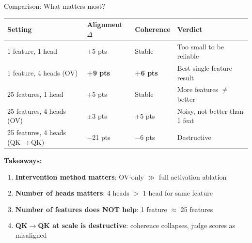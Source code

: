 \documentclass[aspectratio=169]{beamer}
\begin{document}
\begin{frame}{Comparison: What matters most?}
\begin{table}
\small
\centering
\begin{tabular}{p{4cm}p{2.5cm}p{2.5cm}p{4cm}}
\toprule
\textbf{Setting} & \textbf{Alignment $\Delta$} & \textbf{Coherence} & \textbf{Verdict} \\
\midrule
1 feature, 1 head & $\pm$5 pts & Stable & Too small to be reliable \\
1 feature, 4 heads (OV) & \textbf{+9 pts} & \textbf{+6 pts} & Best single-feature result \\
25 features, 1 head & $\pm$5 pts & Stable & More features $\neq$ better \\
25 features, 4 heads (OV) & $\pm$3 pts & +5 pts & Noisy, not better than 1 feat \\
25 features, 4 heads (QK$\to$QK) & $-$21 pts & $-$6 pts & Destructive \\
\bottomrule
\end{tabular}
\end{table}

\vspace{0.5em}
\textbf{Takeaways:}
\begin{enumerate}
    \item \textbf{Intervention method matters}: OV-only $\gg$ full activation ablation
    \item \textbf{Number of heads matters}: 4 heads $>$ 1 head for same feature
    \item \textbf{Number of features does NOT help}: 1 feature $\approx$ 25 features
    \item \textbf{QK$\to$QK at scale is destructive}: coherence collapses, judge scores as misaligned
\end{enumerate}
\end{frame}
\end{document}

